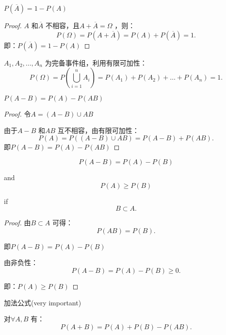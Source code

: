 \begin{rrule}
    $P\left( \overline{A} \right) =1-P\left( A \right) $
\end{rrule}
\begin{proof}
    $A$ 和$\overline{A}$ 不相容，且$A+\overline{A}=\Omega$ ，则：
    \[
        P\left( \Omega \right) =P\left( A+\overline{A} \right) =P\left( A \right) +P\left( \overline{A} \right) =1
    .\] 
    即：$P\left( \overline{A} \right) =1-P\left( A \right) $ 
\end{proof}
\begin{cor}
    $A_1,A_2,\ldots,A_n$ 为完备事件组，利用有限可加性：
    \[
        P\left( \Omega \right) =P\left( \bigcup_{i=1}^{n}A_i \right) =P\left( A_1 \right) +P\left( A_2 \right) +\ldots+P\left( A_n \right) =1
    .\] 
\end{cor}
\begin{rrule}
    $P\left( A-B \right) =P\left( A \right) -P\left( AB \right) $
\end{rrule}
\begin{proof}
    令$A =\left( A-B \right) \cup AB$

    由于$A-B$ 和$AB$ 互不相容，由有限可加性：
     \[
        P\left( A \right) =P\left( \left( A-B \right) \cup AB \right) =P\left( A-B \right) +P\left( AB \right) 
    .\] 
    即$P\left( A-B \right) =P\left( A \right) -P\left( AB \right) $
\end{proof}
\begin{rrule}
    \[
        P\left( A-B \right) =P\left( A \right) -P\left( B \right)
    \]

    and
    \[
        P\left( A \right) \ge P\left( B \right) 
    \] 
    
    if
    \[
        B\subset A
    .\] 
\end{rrule}
\begin{proof}
   由$B\subset A$ 可得：\[
       P\left( AB \right) =P\left( B \right) 
   .\] 

   即$P\left( A-B \right) =P\left( A \right) -P\left( B \right) $ 

   由非负性：\[
       P\left( A-B \right) =P\left( A \right) -P\left( B \right) \ge 0
   .\] 
   
   即：$P\left( A \right) \ge P\left( B \right) $
\end{proof}
\begin{rrule}
    加法公式(very important)

    对$\forall A,B$ 有：\[
        P\left( A+B \right) =P\left( A \right) +P\left( B \right) -P\left( AB \right) 
    .\] 
\end{rrule}
